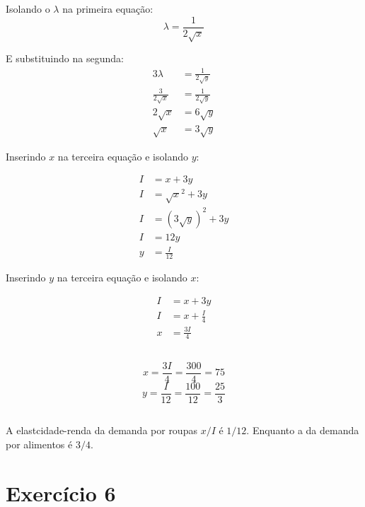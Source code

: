 \documentclass{article}
\begin{document}
Isolando o \(\lambda\) na primeira equação:
\[
	\lambda = \frac{1}{2\sqrt{x}}
\]

E substituindo na segunda:
\[
	\begin{aligned}
		3\lambda            & = \frac{1}{2\sqrt{y}} \\
		\frac{3}{2\sqrt{x}} & = \frac{1}{2\sqrt{y}} \\
		2\sqrt{x}           & = 6\sqrt{y}           \\
		\sqrt{x}            & = 3\sqrt{y}
	\end{aligned}
\]

Inserindo \(x\) na terceira equação e isolando \(y\):

\[
	\begin{aligned}
		I & = x +3y              \\
		I & = \sqrt{x}^2 +3y     \\
		I & = (3\sqrt{y})^2 + 3y \\
		I & = 12y                \\
		y & = \frac{I}{12}
	\end{aligned}
\]

Inserindo \(y\) na terceira equação e isolando \(x\):

\[
	\begin{aligned}
		I & = x + 3y         \\
		I & = x +\frac{I}{4} \\
		x & = \frac{3I}{4}
	\end{aligned}
\]

\subsection{}
\[ x = \frac{3I}{4} = \frac{300}{4} = 75 \]
\[ y = \frac{I}{12} = \frac{100}{12} = \frac{25}{3} \]

\subsection{}
A elastcidade-renda da demanda por roupas \(x/I\) é \(1/12\). Enquanto a da
demanda por alimentos é \(3/4\).

\section{Exercício 6}
\end{document}
